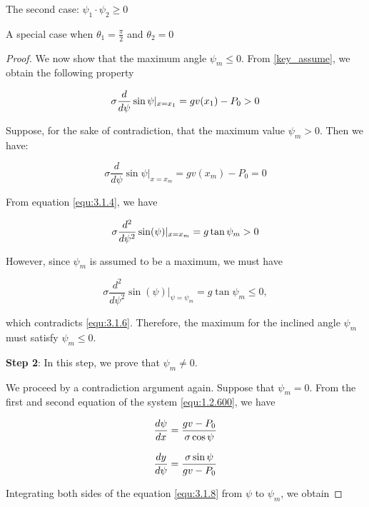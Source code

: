 \documentclass[letterpaper,reqno,10pt,twoside]{amsart}
\theoremstyle{definition}
\theoremstyle{remark}
\begin{document}
\begin{section}{The second case: $\psi_1\cdot \psi_2\geq 0$ }
\begin{subsection}{A special case when $\theta_1=\frac{\pi}{2}$ and $\theta_2=0$}
\begin{proof}
    We now show that the maximum angle $\psi_{m}\leq0$. From \eqref{key_assume}, we obtain the following property

    \begin{equation}{\label{equ:3.1.5}}
        \sigma \frac{d}{d\psi}\sin\psi|_{x=x_{1}}=gv(x_{1})-P_{0}>0
    \end{equation}

    \noindent Suppose, for the sake of contradiction, that the maximum value $\psi_m>0$. Then we have:

    \begin{equation*}
        \sigma \frac{d}{d\psi}\sin\psi|_{x=x_m}=gv(x_m)-P_{0}=0
    \end{equation*}

    \noindent From equation \eqref{equ:3.1.4}, we have

    \begin{equation}{\label{equ:3.1.6}}
        \sigma \frac{d^{2}}{d\psi^{2}}\sin(\psi)|_{x=x_m}=g\tan\psi_m>0
    \end{equation}

    \noindent However, since $\psi_m$ is assumed to be a maximum, we must have
    
    \begin{equation*}
        \sigma \frac{d^{2}}{d\psi^{2}}\sin(\psi)|_{\psi=\psi_m}=g\tan\psi_m\leq 0,
    \end{equation*}

    \noindent which contradicts \eqref{equ:3.1.6}. Therefore, the maximum for the inclined angle $\psi_{m}$ must satisfy $\psi_m\leq 0$.
    
     \textbf{Step 2}: In this step, we prove that $\psi_m\neq 0$. 
     
     We proceed by a contradiction argument again. Suppose that $\psi_m=0$. From the first and second equation of the system \eqref{equ:1.2.600}, we have

    \begin{equation}{\label{equ:3.1.7}}
        \frac{d\psi}{dx}=\frac{gv-P_{0}}{\sigma \cos\psi}
    \end{equation}

    \begin{equation}{\label{equ:3.1.8}}
        \frac{dy}{d\psi}=\frac{\sigma \sin\psi}{gv-P_{0}}
    \end{equation}

    \noindent Integrating both sides of the equation \eqref{equ:3.1.8} from $\psi$ to $\psi_m$, we obtain


\end{proof}
\end{subsection}
\end{section}
\end{document}
